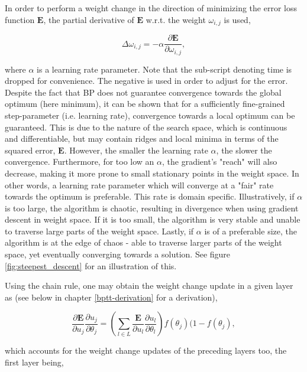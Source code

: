 In order to perform a weight change in the direction of minimizing the error loss function $\textbf{E}$, the partial derivative of $\textbf{E}$ w.r.t. the weight $\omega_{i,j}$ is used,

\begin{equation}
    \Delta \omega_{i,j} = -\alpha \frac{\partial \textbf{E}}{\partial \omega_{i,j}},
\end{equation}

where $\alpha$ is a learning rate parameter. Note that the sub-script denoting time is dropped for convenience.
The negative is used in order to adjust for the error. Despite the fact that BP does not guarantee convergence towards the global optimum (here minimum), it can be shown that for a sufficiently fine-grained step-parameter (i.e. learning rate), convergence towards a local optimum can be guaranteed. This is due to the nature of the search space, which is continuous and differentiable, but may contain ridges and local minima in terms of the squared error, $\textbf{E}$. However, the smaller the learning rate $\alpha$, the slower the convergence. Furthermore, for too low an $\alpha$, the gradient's "reach" will also decrease, making it more prone to small stationary points in the weight space. In other words, a learning rate parameter which will converge at a "fair" rate towards the optimum is preferable. This rate is domain specific. Illustratively, if $\alpha$ is too large, the algorithm is chaotic, resulting in divergence when using gradient descent in weight space. If it is too small, the algorithm is very stable and unable to traverse large parts of the weight space. Lastly, if $\alpha$ is of a preferable size, the algorithm is at the edge of chaos - able to traverse larger parts of the weight space, yet eventually converging towards a solution. See figure \ref{fig:steepest_descent} for an illustration of this.

Using the chain rule, one may obtain the weight change update in a given layer as (see below in chapter \ref{bptt-derivation} for a derivation),

\begin{equation}\label{recursive_derivative_error_activation_input}
    \frac{\partial \textbf{E}}{\partial u_j}\frac{\partial u_j}{\partial \theta_j} = 
    (\sum_{l \in L}\frac{\textbf{E}}{\partial u_l}\frac{\partial u_l}{\partial \theta_l}) f(\theta_j)(1-f(\theta_j),
\end{equation}

which accounts for the weight change updates of the preceding layers too, the first layer being,

